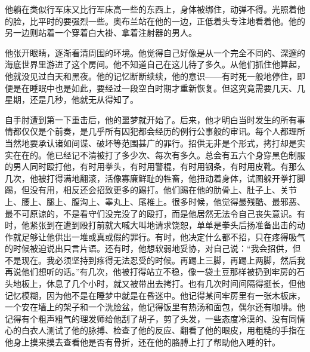他躺在类似行军床又比行军床高一些的东西上，身体被绑住，动弹不得。光照着他的脸，比平时的要强烈一些。奥布兰站在他的一边，正低着头专注地看着他。他的另一边则站着一个穿着白大褂、拿着注射器的男人。

他张开眼睛，逐渐看清周围的环境。他觉得自己好像是从一个完全不同的、深邃的海底世界里游进了这个房间。他不知道自己在这儿待了多久。从他们抓住他算起，他就没见过白天和黑夜。他的记忆断断续续，他的意识——有时死一般地停住，即便是在睡眠中也是如此，要经过一段空白时期才重新恢复。但这究竟需要几天、几星期，还是几秒，他就无从得知了。

自手肘遭到第一下重击后，他的噩梦就开始了。后来，他才明白当时发生的所有事情都仅仅是个前奏，是几乎所有囚犯都会经历的例行公事般的审讯。每个人都理所当然地要承认诸如间谍、破坏等范围甚广的罪行。招供无非是个形式，拷打却是实实在在的。他已经记不清被打了多少次、每次有多久。总会有五六个身穿黑色制服的男人同时殴打他，有时用拳头，有时用警棍，有时用钢条，有时用皮靴。有那么几次，他被打得满地翻滚，活像寡廉鲜耻的牲畜，他扭动着身体，试图躲开拳打脚踢，但没有用，相反还会招致更多的踢打。他们踢在他的肋骨上、肚子上、关节上、腰上、腿上、腹沟上、睾丸上、尾椎上。很多时候，他觉得最残酷、最邪恶、最不可原谅的，不是看守们没完没了的殴打，而是他居然无法令自己丧失意识。有时，他紧张到在遭到殴打前就大喊大叫地请求饶恕，单单是拳头后扬准备出击的动作就足够让他供出一堆或真或假的罪行。有时，他决定什么都不招，只在疼得吸气的时候被迫说出只言片语。还有时，他想软弱地妥协，对自己说：``我会招供，但不是现在。我必须坚持到疼得无法忍受的时候。再踢上三脚，再踢上两脚，然后我再说他们想听的话。''有几次，他被打得站立不稳，像一袋土豆那样被扔到牢房的石头地板上，休息了几个小时，就又被带出去拷打。也有几次时间间隔得挺长，但他记忆模糊，因为他不是在睡梦中就是在昏迷中。他记得某间牢房里有一张木板床，一个安在墙上的架子和一个洗脸盆，他记得饭里有热汤和面包，偶尔还有咖啡。他记得有个粗声粗气的理发师给他刮了胡子，剪了头发，一些态度冷漠的、没有同情心的白衣人测试了他的脉搏、检查了他的反应、翻看了他的眼皮，用粗糙的手指在他身上摸来摸去查看他是否有骨折，还在他的胳膊上打了帮助他入睡的针。

